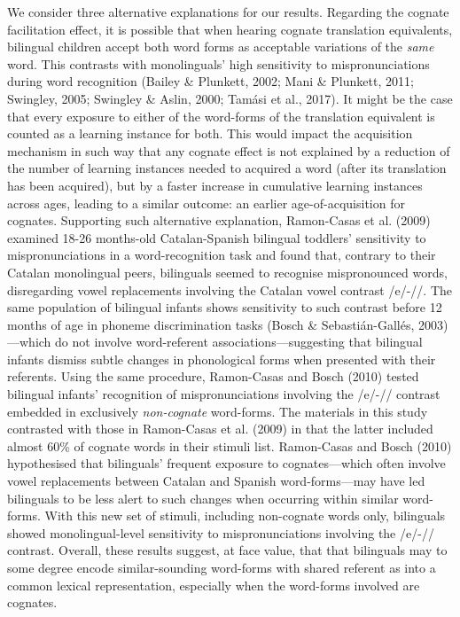 \documentclass[
  man,
  floatsintext,
  colorlinks=true,linkcolor=blue,citecolor=blue,urlcolor=blue,biblatex]{apa7}
\begin{document}
We consider three alternative explanations for our results. Regarding
the cognate facilitation effect, it is possible that when hearing
cognate translation equivalents, bilingual children accept both word
forms as acceptable variations of the \emph{same} word. This contrasts
with monolinguals' high sensitivity to mispronunciations during word
recognition (Bailey \& Plunkett, 2002; Mani \& Plunkett, 2011; Swingley,
2005; Swingley \& Aslin, 2000; Tamási et al., 2017). It might be the
case that every exposure to either of the word-forms of the translation
equivalent is counted as a learning instance for both. This would impact
the acquisition mechanism in such way that any cognate effect is not
explained by a reduction of the number of learning instances needed to
acquired a word (after its translation has been acquired), but by a
faster increase in cumulative learning instances across ages, leading to
a similar outcome: an earlier age-of-acquisition for cognates.
Supporting such alternative explanation, Ramon-Casas et al. (2009)
examined 18-26 months-old Catalan-Spanish bilingual toddlers'
sensitivity to mispronunciations in a word-recognition task and found
that, contrary to their Catalan monolingual peers, bilinguals seemed to
recognise mispronounced words, disregarding vowel replacements involving
the Catalan vowel contrast /e/-/\textepsilon/. The same population of
bilingual infants shows sensitivity to such contrast before 12 months of
age in phoneme discrimination tasks (Bosch \& Sebastián-Gallés,
2003)---which do not involve word-referent associations---suggesting
that bilingual infants dismiss subtle changes in phonological forms when
presented with their referents. Using the same procedure, Ramon-Casas
and Bosch (2010) tested bilingual infants' recognition of
mispronunciations involving the /e/-/\textepsilon/ contrast embedded in
exclusively \emph{non-cognate} word-forms. The materials in this study
contrasted with those in Ramon-Casas et al. (2009) in that the latter
included almost 60\% of cognate words in their stimuli list. Ramon-Casas
and Bosch (2010) hypothesised that bilinguals' frequent exposure to
cognates---which often involve vowel replacements between Catalan and
Spanish word-forms---may have led bilinguals to be less alert to such
changes when occurring within similar word-forms. With this new set of
stimuli, including non-cognate words only, bilinguals showed
monolingual-level sensitivity to mispronunciations involving the
/e/-/\textepsilon/ contrast. Overall, these results suggest, at face
value, that that bilinguals may to some degree encode similar-sounding
word-forms with shared referent as into a common lexical representation,
especially when the word-forms involved are cognates.
\end{document}
